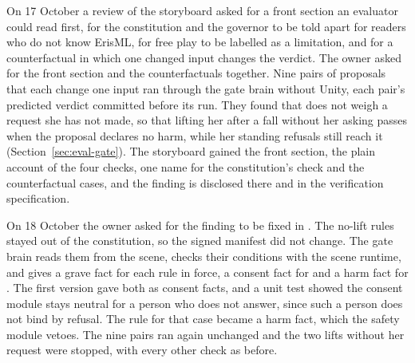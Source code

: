 On 17 October a review of the storyboard asked for a front section an evaluator could read first,
for the constitution and the governor to be told apart for readers who do not know ErisML, for free
play to be labelled as a limitation, and for a counterfactual in which one changed input changes
the verdict. The owner asked for the front section and the counterfactuals together. Nine pairs of
proposals that each change one input ran through the gate brain without Unity, each pair's
predicted verdict committed before its run. They found that \deme{} does not weigh a request she
has not made, so that lifting her after a fall without her asking passes when the proposal declares
no harm, while her standing refusals still reach it (Section~\ref{sec:eval-gate}). The storyboard
gained the front section, the plain account of the four checks, one name for the constitution's
check and the counterfactual cases, and the finding is disclosed there and in the verification
specification.

On 18 October the owner asked for the finding to be fixed in \deme{}. The no-lift rules stayed out
of the constitution, so the signed manifest did not change. The gate brain reads them from the
scene, checks their conditions with the scene runtime, and gives \deme{} a grave fact for each rule
in force, a consent fact for  and a harm fact for . The first
version gave both as consent facts, and a unit test showed the consent module stays neutral for a
person who does not answer, since such a person does not bind by refusal. The rule for that case
became a harm fact, which the safety module vetoes. The nine pairs ran again unchanged and the two
lifts without her request were stopped, with every other check as before.

